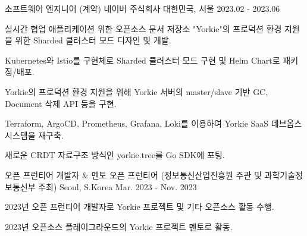 

\begin{cventries}

  \cventry
    {소프트웨어 엔지니어 (계약)} %
    {네이버 주식회사} %
    {대한민국, 서울} %
    {2023.02 - 2023.06} %
    {
      \begin{cvitems} %
        \item {실시간 협업 애플리케이션 위한 오픈소스 문서 저장소 "Yorkie"의 프로덕션 환경 지원을 위한 Sharded 클러스터 모드 디자인 및 개발.}
        \item {Kubernetes와 Istio를 구현체로 Sharded 클러스터 모드 구현 및 Helm Chart로 패키징/배포.}
        \item {Yorkie의 프로덕션 환경 지원을 위해 Yorkie 서버의 master/slave 기반 GC, Document 삭제 API 등을 구현.}        
        \item {Terraform, ArgoCD, Prometheus, Grafana, Loki를 이용하여 Yorkie SaaS 데브옵스 시스템을 재구축.}
        \item {새로운 CRDT 자료구조 방식인 yorkie.tree를 Go SDK에 포팅.}
      \end{cvitems}
    }

  \cventry
    {오픈 프런티어 개발자 \& 멘토} %
    {오픈 프런티어 (정보통신산업진흥원 주관 및 과학기술정보통신부 주최)} %
    {Seoul, S.Korea} %
    {Mar. 2023 - Nov. 2023} %
    {
      \begin{cvitems} %
        \item {2023년 오픈 프런티어 개발자로 Yorkie 프로젝트 및 기타 오픈소스 활동 수행.}
        \item {2023년 오픈소스 플레이그라운드의 Yorkie 프로젝트 멘토로 활동.}
      \end{cvitems}
    }


\end{cventries}
